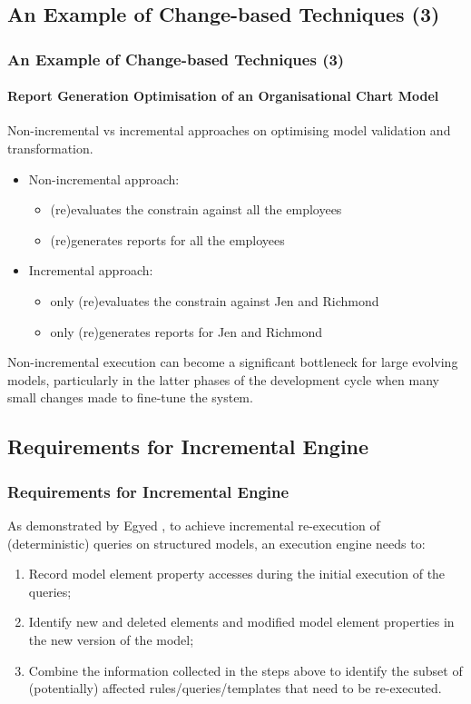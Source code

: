 \documentclass{beamer}
\begin{document}
\begin{frame}
\section{An Example of Change-based Techniques (3)}
\frametitle{An Example of Change-based Techniques (3)}
\label{sec:An example_of_change-based_techniques_3}
\framesubtitle{Report Generation Optimisation of an Organisational Chart Model}
Non-incremental vs incremental approaches on optimising model validation and transformation.
\begin{itemize}
\item Non-incremental approach:
    \begin{itemize}
    \item (re)evaluates the constrain against all the employees
    \item (re)generates reports for all the employees
    \end{itemize}
\item Incremental approach:
    \begin{itemize}
    \item  only (re)evaluates the constrain against Jen and Richmond
    \item only (re)generates reports for Jen and Richmond
    \end{itemize}
\end{itemize}
Non-incremental execution can become a significant bottleneck for large evolving models, particularly in the latter phases of the development cycle when many small changes made to fine-tune the system\cite{selic2003pragmatics}.
\end{frame}

\begin{frame}
\section{Requirements for Incremental Engine}
\frametitle{Requirements for Incremental Engine}
As demonstrated by Egyed \cite{egyed2011automatically}, to achieve incremental re-execution of (deterministic) queries on structured models, an execution engine needs to:
\begin{enumerate}
\item Record model element property accesses during the initial execution of the queries;
\item Identify new and deleted elements and modified model element properties in the new version of the model;
\item Combine the information collected in the steps above to identify the subset of (potentially) affected rules/queries/templates that need to be re-executed.
\end{enumerate}
\end{frame}
\end{document}
